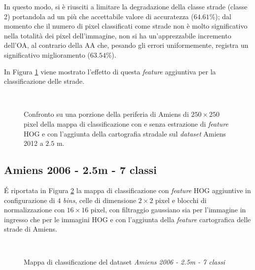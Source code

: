 In questo modo, si è riusciti a limitare la degradazione della classe
strade (classe 2) portandola ad un più che accettabile valore di
accuratezza ($64.61\%$); dal momento che il numero di pixel
classificati come strade non è molto significativo nella totalità dei
pixel dell'immagine, non si ha un'apprezzabile incremento dell'OA,
al
contrario della AA che, pesando gli errori uniformemente, registra un
significativo miglioramento ($63.54\%$).

In Figura \ref{fig:confrontoAmiens2012_2_5m} viene mostrato l'effetto
di questa \emph{feature} aggiuntiva per la classificazione delle
strade.


\begin{figure}[!ht]
\center
{}
\hspace{3mm}
\\
\caption{Confronto su una porzione della periferia di Amiens di
$250\times250$ pixel della mappa di classificazione con e senza
estrazione di \emph{feature} HOG e con l'aggiunta della cartografia
stradale sul \emph{dataset} Amiens 2012 a $2.5$ m. }
\label{fig:confrontoAmiens2012_2_5m}
\end{figure}

\clearpage

\subsection{Amiens 2006 - 2.5m - 7 classi}

\'E riportata in Figura \ref{fig:ClassMap_Amiens2006_2_5m_roadsandhog}
la mappa di classificazione con \emph{feature} HOG aggiuntive in
configurazione di $4$ \emph{bins}, celle di dimensione $2\times2$
pixel e blocchi di normalizzazione con $16\times16$ pixel, con
filtraggio gaussiano sia per l'immagine in ingresso che per le
immagini HOG e con l'aggiunta della \emph{feature} cartografica delle
strade di Amiens.

\begin{figure}[!ht]

\center
{}
\\

\caption{Mappa di classificazione del dataset \emph{Amiens 2006 - 2.5m
- 7 classi}}

\label{fig:ClassMap_Amiens2006_2_5m_roadsandhog}

\end{figure}

